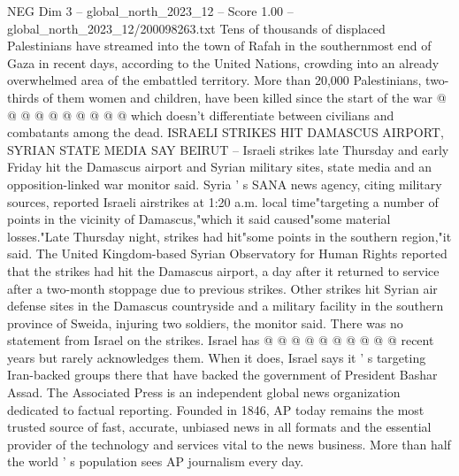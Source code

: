 \begin{textsample}{NEG Dim 3 – global\_north\_2023\_12 – Score 1.00 – global\_north\_2023\_12/200098263.txt}
Tens of thousands of displaced Palestinians have streamed into the town of Rafah in the southernmost end of Gaza in recent days, according to the United Nations, crowding into an already overwhelmed area of the embattled territory.
More than 20,000 Palestinians, two-thirds of them women and children, have been killed since the start of the war @ @ @ @ @ @ @ @ @ @ which doesn't differentiate between civilians and combatants among the dead.
ISRAELI STRIKES HIT DAMASCUS AIRPORT, SYRIAN STATE MEDIA SAY BEIRUT -- Israeli strikes late Thursday and early Friday hit the Damascus airport and Syrian military sites, state media and an opposition-linked war monitor said.
Syria ' s SANA news agency, citing military sources, reported Israeli airstrikes at 1:20 a.m. local time"targeting a number of points in the vicinity of Damascus,"which it said caused"some material losses."Late Thursday night, strikes had hit"some points in the southern region,"it said.
The United Kingdom-based Syrian Observatory for Human Rights reported that the strikes had hit the Damascus airport, a day after it returned to service after a two-month stoppage due to previous strikes.
Other strikes hit Syrian air defense sites in the Damascus countryside and a military facility in the southern province of Sweida, injuring two soldiers, the monitor said.
There was no statement from Israel on the strikes.
Israel has @ @ @ @ @ @ @ @ @ @ recent years but rarely acknowledges them.
When it does, Israel says it ' s targeting Iran-backed groups there that have backed the government of President Bashar Assad.
The Associated Press is an independent global news organization dedicated to factual reporting.
Founded in 1846, AP today remains the most trusted source of fast, accurate, unbiased news in all formats and the essential provider of the technology and services vital to the news business.
More than half the world ' s population sees AP journalism every day.

\end{textsample}
